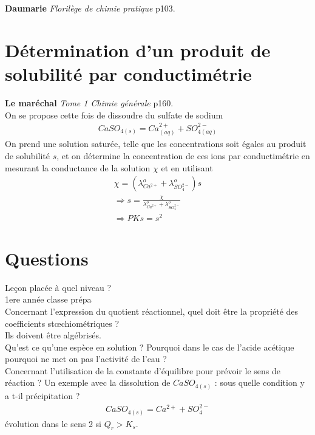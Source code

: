 \documentclass[12pt,prb,aps,epsf]{article}
\begin{document}
\textbf{Daumarie} \textit{Florilège de chimie pratique} p103.

\section{Détermination d'un produit de solubilité par conductimétrie}
\textbf{Le maréchal} \textit{Tome 1 Chimie générale} p160.\\

On se propose cette fois de dissoudre du sulfate de sodium
\begin{eqnarray}
CaSO_{4(s)} = Ca^{2+}_{(aq)} + SO_{4(aq)}^{2-}
\end{eqnarray}
On prend une solution saturée, telle que les concentrations soit égales au produit de solubilité $s$, et on détermine la concentration de ces ions par conductimétrie en mesurant la conductance de la solution $\chi$ et en utilisant 
\begin{eqnarray}
\chi = (\lambda^{o}_{Ca^{2+}} + \lambda^{o}_{SO_4^{2-}})s\\
\Rightarrow s = \frac{\chi}{\lambda^{o}_{Ca^{2+}} + \lambda^{o}_{SO_4^{2-}}}\\
\Rightarrow PKs = s^2
\end{eqnarray}

\section*{Questions}
Leçon placée à quel niveau ?\\
1ere année classe prépa\\

Concernant l'expression du quotient réactionnel, quel doit être la propriété des coefficients stœchiométriques ?\\
Ils doivent être algébrisés.\\

Qu'est ce qu'une espèce en solution ? Pourquoi dans le cas de l'acide acétique pourquoi ne met on pas l'activité de l'eau ?\\

Concernant l'utilisation de la constante d'équilibre pour prévoir le sens de réaction ? Un exemple avec la dissolution de $CaSO_{4(s)}$ : sous quelle condition y a t-il précipitation ?
\begin{eqnarray}
CaSO_{4(s)} = Ca^{2+} + SO_4^{2-}
\end{eqnarray}
évolution dans le sens 2 si $Q_r>K_s$.\\
\end{document}
